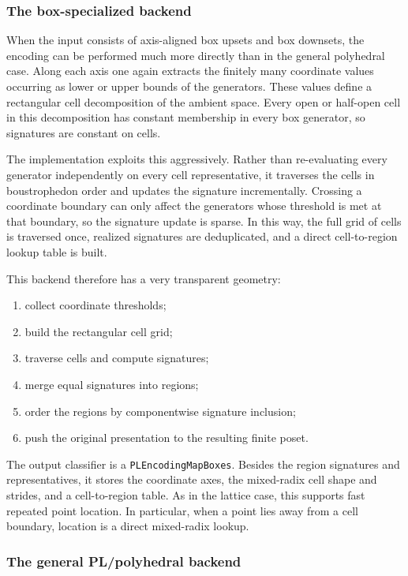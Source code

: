 \documentclass[11pt]{article}
\theoremstyle{definition}
\theoremstyle{remark}
\begin{document}
\subsubsection*{The box-specialized backend}

When the input consists of axis-aligned box upsets and box downsets, the encoding can be performed much more directly than in the general polyhedral case.  Along each axis one again extracts the finitely many coordinate values occurring as lower or upper bounds of the generators.  These values define a rectangular cell decomposition of the ambient space.  Every open or half-open cell in this decomposition has constant membership in every box generator, so signatures are constant on cells.

The implementation exploits this aggressively.  Rather than re-evaluating every generator independently on every cell representative, it traverses the cells in boustrophedon order and updates the signature incrementally.  Crossing a coordinate boundary can only affect the generators whose threshold is met at that boundary, so the signature update is sparse.  In this way, the full grid of cells is traversed once, realized signatures are deduplicated, and a direct cell-to-region lookup table is built.

This backend therefore has a very transparent geometry:
\begin{enumerate}[label=(\roman*)]
	\item collect coordinate thresholds;
	\item build the rectangular cell grid;
	\item traverse cells and compute signatures;
	\item merge equal signatures into regions;
	\item order the regions by componentwise signature inclusion;
	\item push the original presentation to the resulting finite poset.
\end{enumerate}

The output classifier is a \texttt{PLEncodingMapBoxes}.  Besides the region signatures and representatives, it stores the coordinate axes, the mixed-radix cell shape and strides, and a cell-to-region table.  As in the lattice case, this supports fast repeated point location.  In particular, when a point lies away from a cell boundary, location is a direct mixed-radix lookup.

\subsubsection*{The general PL/polyhedral backend}
\end{document}
